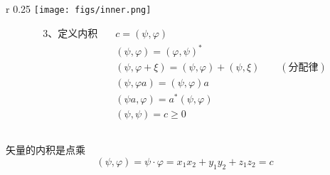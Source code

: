 \begin{frame} 
    \begin{wrapfigure} {r} {0.25\textwidth} %
        \texttt{[image: figs/inner.png]}   
    \end{wrapfigure}
    \begin{equation*}
        \begin{split}
            \text{3、定义内积} \quad &c=(\psi, \varphi)\\
            &(\psi, \varphi)= (\varphi,\psi)^* \\
            &(\psi, \varphi+\xi)= (\psi, \varphi) + (\psi, \xi)\qquad (\text{分配律})\\
            &(\psi, \varphi a)= (\psi, \varphi )a \\
            &(\psi a, \varphi )= a^* (\psi, \varphi ) \\
            &(\psi,\psi)= c\ge 0\\
        \end{split}  
    \end{equation*}
\end{frame}

\begin{frame} 
    \frametitle{}
    \解 矢量的内积是点乘 \[(\psi, \varphi) = \psi \cdot \varphi= x_1x_2+y_1y_2+z_1z_2=c\]
\end{frame} 

